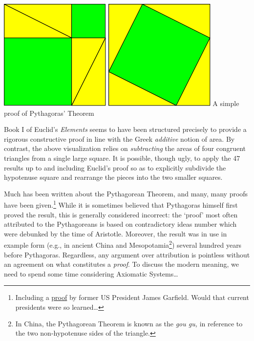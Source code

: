\begin{center}
	\includegraphics[width=0.3\linewidth]{pythag}
	\qquad\qquad\qquad\qquad
	\includegraphics[width=0.3\linewidth]{pythag2}
	\medbreak
	A simple proof of Pythagoras' Theorem
\end{center}
Book I of Euclid's \emph{Elements} seems to have been structured precisely to provide a rigorous constructive proof in line with the Greek \emph{additive} notion of area. By contrast, the above visualization relies on \emph{subtracting} the areas of four congruent triangles from a single large square. It is possible, though ugly, to apply the 47 results up to and including Euclid's proof so as to explicitly subdivide the hypotenuse square and rearrange the pieces into the two smaller squares.
\smallbreak


Much has been written about the Pythagorean Theorem, and many, many proofs have been given.\footnote{%
	Including a \href{https://old.maa.org/press/periodicals/convergence/mathematical-treasure-james-a-garfields-proof-of-the-pythagorean-theorem}{proof} by former US President James Garfield. Would that current presidents were so learned\ldots%
}
While it is sometimes believed that Pythagoras himself first proved the result, this is generally considered incorrect: the `proof' most often attributed to the Pythagoreans is based on contradictory ideas number which were debunked by the time of Aristotle. Moreover, the result was in use in example form (e.g., in ancient China and Mesopotamia\footnote{%
	In China, the Pythagorean Theorem is known as the \emph{gou gu,} in reference to the two non-hypotenuse sides of the triangle.%
})
several hundred years before Pythagoras. Regardless, any argument over attribution is pointless without an agreement on what constitutes a \emph{proof}. To discuss the modern meaning, we need to spend some time considering Axiomatic Systems\ldots 


